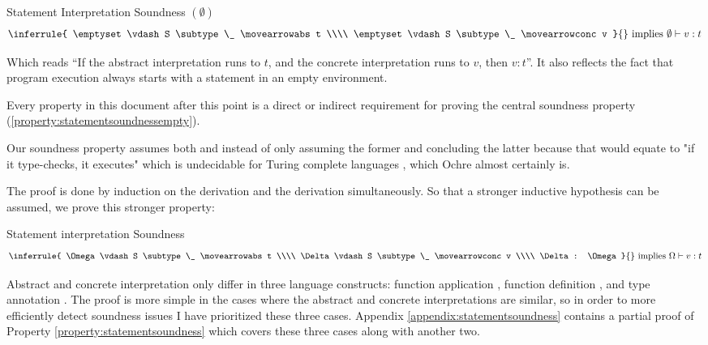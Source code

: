 \documentclass[12pt,twoside]{report}
\begin{document}
  \noindent
  \begin{Property}{Statement Interpretation Soundness $(\emptyset)$}{}
    \[
      \oimplies{
        \inferrule{
          \emptyset \vdash S \subtype \_ \movearrowabs t \\\\
          \emptyset \vdash S \subtype \_ \movearrowconc v
        }{}
      }{
        \emptyset \vdash v: t
      }
    \]
  \end{Property}
  \label{property:statementsoundnessempty}

Which reads ``If the abstract interpretation runs to $t$, and the concrete interpretation runs to $v$, then $v:t$''. It also reflects the fact that program execution always starts with a statement in an empty environment.

Every property in this document after this point is a direct or indirect requirement for proving the central soundness property (\ref{property:statementsoundnessempty}).

Our soundness property assumes both \movearrowabs and \movearrowconc instead of only assuming the former and concluding the latter because that would equate to "if it type-checks, it executes" which is undecidable for Turing complete languages \citep{turingComputableNumbersApplication1937}, which Ochre almost certainly is.

The proof is done by induction on the \movearrowabs derivation and the \movearrowconc derivation simultaneously. So that a stronger inductive hypothesis can be assumed, we prove this stronger property:

\begin{Property}{Statement interpretation Soundness}{}
  \[
    \oimplies{
      \inferrule{
      \Omega \vdash S \subtype \_ \movearrowabs t \\\\
      \Delta \vdash S \subtype \_ \movearrowconc v \\\\
      \Delta : \Omega
    }{}  
    }{
      \Omega \vdash v: t
    }
  \]
  \end{Property}
\label{property:statementsoundness}

Abstract and concrete interpretation only differ in three language constructs: function application , function definition , and type annotation . The proof is more simple in the cases where the abstract and concrete interpretations are similar, so in order to more efficiently detect soundness issues I have prioritized these three cases. Appendix \ref{appendix:statementsoundness} contains a partial proof of Property \ref{property:statementsoundness} which covers these three cases along with another two.
\end{document}
